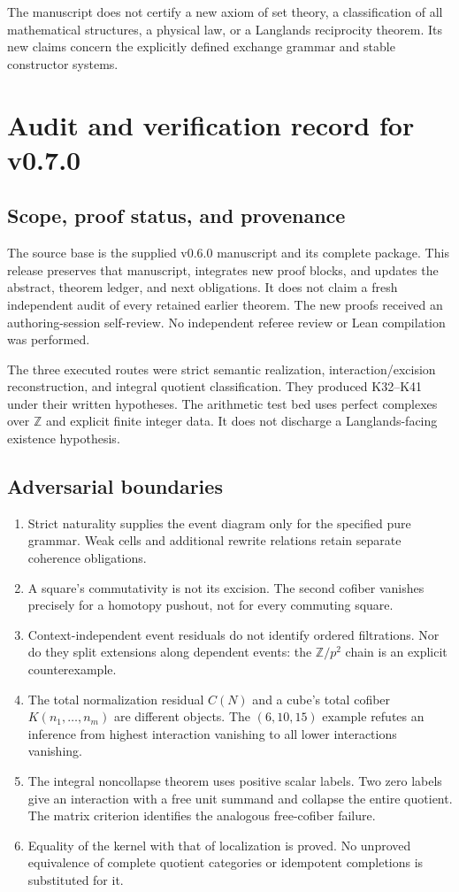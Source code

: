 \documentclass[11pt]{article}
\theoremstyle{definition}
\theoremstyle{remark}
\begin{document}
The manuscript does not certify a new axiom of set theory, a classification of all mathematical structures, a physical law, or a Langlands reciprocity theorem. Its new claims concern the explicitly defined exchange grammar and stable constructor systems.

\clearpage
\section{Audit and verification record for v0.7.0}\label{app:audit-v070}

\subsection{Scope, proof status, and provenance}
The source base is the supplied v0.6.0 manuscript and its complete package. This release preserves that manuscript, integrates new proof blocks, and updates the abstract, theorem ledger, and next obligations. It does not claim a fresh independent audit of every retained earlier theorem. The new proofs received an authoring-session self-review. No independent referee review or Lean compilation was performed.

The three executed routes were strict semantic realization, interaction/excision reconstruction, and integral quotient classification. They produced K32--K41 under their written hypotheses. The arithmetic test bed uses perfect complexes over $\mathbb Z$ and explicit finite integer data. It does not discharge a Langlands-facing existence hypothesis.

\subsection{Adversarial boundaries}
\begin{enumerate}
\item Strict naturality supplies the event diagram only for the specified pure grammar. Weak cells and additional rewrite relations retain separate coherence obligations.
\item A square's commutativity is not its excision. The second cofiber vanishes precisely for a homotopy pushout, not for every commuting square.
\item Context-independent event residuals do not identify ordered filtrations. Nor do they split extensions along dependent events: the $\mathbb Z/p^2$ chain is an explicit counterexample.
\item The total normalization residual $C(N)$ and a cube's total cofiber $K(n_1,\ldots,n_m)$ are different objects. The $(6,10,15)$ example refutes an inference from highest interaction vanishing to all lower interactions vanishing.
\item The integral noncollapse theorem uses positive scalar labels. Two zero labels give an interaction with a free unit summand and collapse the entire quotient. The matrix criterion identifies the analogous free-cofiber failure.
\item Equality of the kernel with that of localization is proved. No unproved equivalence of complete quotient categories or idempotent completions is substituted for it.
\end{enumerate}
\end{document}
